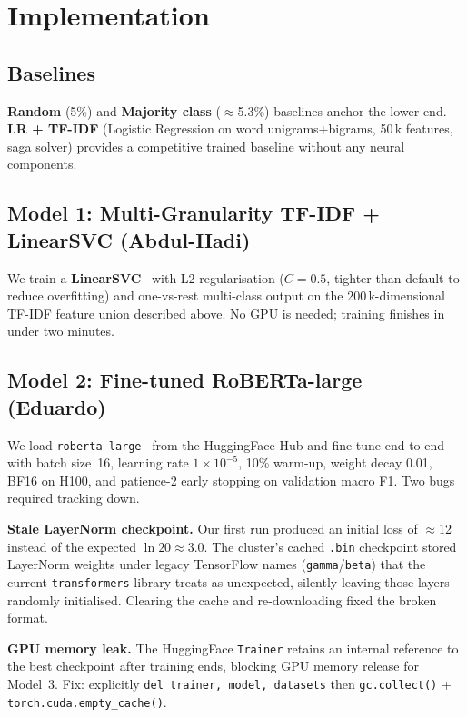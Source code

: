 \documentclass[11pt]{article}
\begin{document}
\section{Implementation}
\label{sec:impl}

\subsection{Baselines}

\textbf{Random} (5\%) and \textbf{Majority class} ($\approx$5.3\%)
baselines anchor the lower end.  \textbf{LR + TF-IDF} (Logistic
Regression on word unigrams+bigrams, 50\,k features, saga solver)
provides a competitive trained baseline without any neural components.

\subsection{Model 1: Multi-Granularity TF-IDF + LinearSVC (Abdul-Hadi)}

We train a \textbf{LinearSVC}~\citep{Joachims1998} with L2
regularisation ($C=0.5$, tighter than default to reduce overfitting)
and one-vs-rest multi-class output on the 200\,k-dimensional TF-IDF
feature union described above.  No GPU is needed; training finishes in
under two minutes.

\subsection{Model 2: Fine-tuned RoBERTa-large (Eduardo)}

We load \texttt{roberta-large}~\citep{Liu2019RoBERTa} from the
HuggingFace Hub and fine-tune end-to-end with batch size~16, learning
rate $1\times10^{-5}$, 10\% warm-up, weight decay 0.01, BF16 on H100,
and patience-2 early stopping on validation macro F1.  Two bugs
required tracking down.

\textbf{Stale LayerNorm checkpoint.}  Our first run produced an initial
loss of $\approx$12 instead of the expected $\ln 20 \approx 3.0$.  The
cluster's cached \texttt{.bin} checkpoint stored LayerNorm weights under
legacy TensorFlow names (\texttt{gamma}/\texttt{beta}) that the current
\texttt{transformers} library treats as unexpected, silently leaving
those layers randomly initialised.  Clearing the cache and
re-downloading fixed the broken format.

\textbf{GPU memory leak.}  The HuggingFace \texttt{Trainer} retains an
internal reference to the best checkpoint after training ends, blocking
GPU memory release for Model~3.  Fix: explicitly
\texttt{del trainer, model, datasets} then
\texttt{gc.collect()} + \texttt{torch.cuda.empty\_cache()}.
\end{document}
